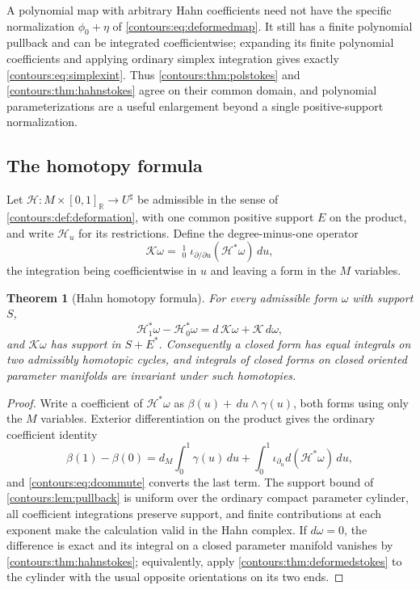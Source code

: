 \documentclass[11pt,letterpaper]{article}
\newtheorem{theorem}{Theorem}[section]
\theoremstyle{definition}
\theoremstyle{remark}
\newcommand{\R}{\mathbb R}\newcommand{\C}{\mathbb C}\newcommand{\Q}{\mathbb Q}
\newcommand{\HInt}{\mathop{\int^{\!H}}\nolimits}
\newcommand{\sh}{^{\sharp}}\newcommand{\dd}{\,d}
\numberwithin{equation}{section}
\begin{document}
A polynomial map with arbitrary Hahn coefficients need not have the specific
normalization $\phi_0+\eta$ of \eqref{contours:eq:deformedmap}. It still has a
finite polynomial pullback and can be integrated coefficientwise; expanding its
finite polynomial coefficients and applying ordinary simplex integration gives
exactly \eqref{contours:eq:simplexint}. Thus \cref{contours:thm:polstokes} and
\cref{contours:thm:hahnstokes} agree on their common domain, and polynomial
parameterizations are a useful enlargement beyond a single positive-support
normalization.

\subsection{The homotopy formula}
Let $\mathcal H:M\times[0,1]_\R\to U\sh$ be admissible in the sense of
\cref{contours:def:deformation}, with one common positive support $E$ on the
product, and write $\mathcal H_u$ for its restrictions. Define the degree-minus-one
operator
\begin{equation}\label{contours:eq:homotopyoperator}
  \mathcal K\omega=\HInt_0^1\iota_{\partial/\partial u}
  (\mathcal H^*\omega)\dd u ,
\end{equation}
the integration being coefficientwise in $u$ and leaving a form in the $M$
variables.

\begin{theorem}[Hahn homotopy formula]\label{contours:thm:homotopy}
For every admissible form $\omega$ with support $S$,
\begin{equation}\label{contours:eq:homotopyformula}
  \mathcal H_1^*\omega-\mathcal H_0^*\omega
  =d\,\mathcal K\omega+\mathcal K\,d\omega ,
\end{equation}
and $\mathcal K\omega$ has support in $S+E^*$. Consequently a closed form has equal
integrals on two admissibly homotopic cycles, and integrals of closed forms on
closed oriented parameter manifolds are invariant under such homotopies.
\end{theorem}
\begin{proof}
Write a coefficient of $\mathcal H^*\omega$ as $\beta(u)+\dd u\wedge\gamma(u)$, both
forms using only the $M$ variables. Exterior differentiation on the product gives
the ordinary coefficient identity
\[
  \beta(1)-\beta(0)=d_M\int_0^1\gamma(u)\dd u
  +\int_0^1\iota_{\partial_u}d(\mathcal H^*\omega)\dd u ,
\]
and \eqref{contours:eq:dcommute} converts the last term. The support bound of
\cref{contours:lem:pullback} is uniform over the ordinary compact parameter
cylinder, all coefficient integrations preserve support, and finite contributions at
each exponent make the calculation valid in the Hahn complex. If $d\omega=0$, the
difference is exact and its integral on a closed parameter manifold vanishes by
\cref{contours:thm:hahnstokes}; equivalently, apply
\cref{contours:thm:deformedstokes} to the cylinder with the usual opposite
orientations on its two ends.
\end{proof}
\end{document}
